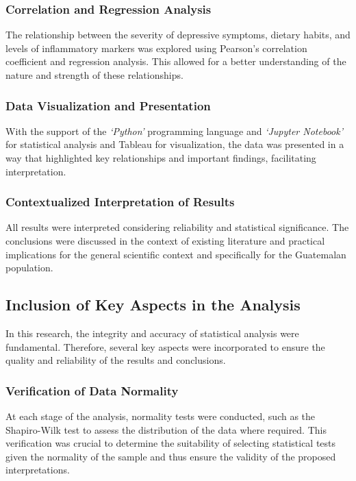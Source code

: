 \documentclass[jou]{apa7}
\begin{document}
\subsubsection{Correlation and Regression Analysis}
The relationship between the severity of depressive symptoms, dietary habits, and levels of inflammatory markers was explored using Pearson's correlation coefficient and regression analysis. This allowed for a better understanding of the nature and strength of these relationships.

\subsubsection{Data Visualization and Presentation}
With the support of the \emph{`Python'} programming language and \emph{`Jupyter Notebook'} for statistical analysis and Tableau for visualization, the data was presented in a way that highlighted key relationships and important findings, facilitating interpretation.

\subsubsection{Contextualized Interpretation of Results}
All results were interpreted considering reliability and statistical significance. The conclusions were discussed in the context of existing literature and practical implications for the general scientific context and specifically for the Guatemalan population.

\subsection{Inclusion of Key Aspects in the Analysis}\label{inclusiuxf3n-de-aspectos-clave-en-el-anuxe1lisis}

In this research, the integrity and accuracy of statistical analysis were fundamental. Therefore, several key aspects were incorporated to ensure the quality and reliability of the results and conclusions.\\

\subsubsection{Verification of Data Normality}
At each stage of the analysis, normality tests were conducted, such as the Shapiro-Wilk test to assess the distribution of the data where required. This verification was crucial to determine the suitability of selecting statistical tests given the normality of the sample and thus ensure the validity of the proposed interpretations.
\end{document}
